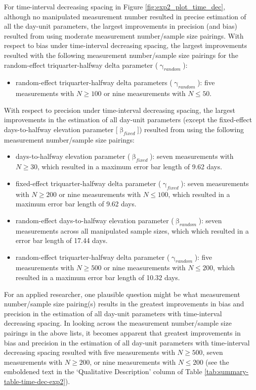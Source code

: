 \documentclass[
12pt, %
twoside,
english]{guelphthesis}
\begin{document}
For time-interval decreasing spacing in Figure \ref{fig:exp2_plot_time_dec}, although no manipulated measurement number resulted in precise estimation of all the day-unit parameters, the largest improvements in precision (and bias) resulted from using moderate measurement number/sample size pairings. With respect to bias under time-interval decreasing spacing, the largest improvements resulted with the following measurement number/sample size pairings for the random-effect triquarter-halfway delta parameter (\(\upgamma_{random}\)):
\begin{itemize}
\tightlist
\item
  random-effect triquarter-halfway delta parameters (\(\upgamma_{random}\)): five measurements with \(N \ge 100\) or nine measurements with \(N \le 50\).
\end{itemize}
\noindent With respect to precision under time-interval decreasing spacing, the largest improvements in the estimation of all day-unit parameters (except the fixed-effect days-to-halfway elevation parameter {[}\(\upbeta_{fixed}\){]}) resulted from using the following measurement number/sample size pairings:
\begin{itemize}
\tightlist
\item
  days-to-halfway elevation parameter (\(\upbeta_{fixed}\)): seven measurements with \(N \ge 30\), which resulted in a maximum error bar length of 9.62 days.
\item
  fixed-effect triquarter-halfway delta parameter (\(\upgamma_{fixed}\)): seven measurements with \(N \ge 200\) or nine measurements with \(N \le 100\), which resulted in a maximum error bar length of 9.62 days.
\item
  random-effect days-to-halfway elevation parameter (\(\upbeta_{random}\)): seven measurements across all manipulated sample sizes, which which resulted in a error bar length of 17.44 days.
\item
  random-effect triquarter-halfway delta parameter (\(\upgamma_{random}\)): five measurements with \(N \ge 500\) or nine measurements with \(N \le 200\), which resulted in a maximum error bar length of 10.32 days.
\end{itemize}
For an applied researcher, one plausible question might be what measurement number/sample size pairing(s) results in the greatest improvements in bias and precision in the estimation of all day-unit parameters with time-interval decreasing spacing. In looking across the measurement number/sample size pairings in the above lists, it becomes apparent that greatest improvements in bias and precision in the estimation of all day-unit parameters with time-interval decreasing spacing resulted with five measurements with \(N \ge 500\), seven measurements with \(N \ge 200\), or nine measurements with \(N \le 200\) (see the emboldened text in the `Qualitative Description' column of Table \ref{tab:summary-table-time-dec-exp2}).
\end{document}
